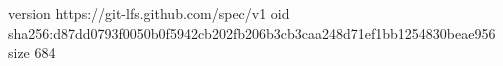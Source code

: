 version https://git-lfs.github.com/spec/v1
oid sha256:d87dd0793f0050b0f5942cb202fb206b3cb3caa248d71ef1bb1254830beae956
size 684
